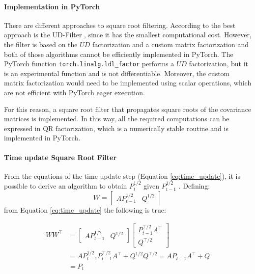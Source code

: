 \documentclass{article}
\begin{document}
\paragraph{Implementation in PyTorch}
There are different approaches to square root filtering. According to \textcite{mohinder_s_grewal_kalman_2001} the best approach is the UD-Filter \cite{bierman_numerical_1977}, since it has the smallest computational cost. However, the filter is based on the $UD$ factorization and a custom matrix factorization \cite{mohinder_s_grewal_kalman_2001} and both of those algorithms cannot be efficiently implemented in \textsf{PyTorch}. The \textsf{PyTorch} function \verb|torch.linalg.ldl_factor| performs a $UD$ factorization, but it is an experimental function and is not differentiable. Moreover, the custom matrix factorization would need to be implemented using scalar operations, which are not efficient with \textsf{PyTorch} eager execution.

For this reason, a square root filter that propagates square roots of the covariance matrices is implemented. In this way, all the required computations can be expressed in QR factorization, which is a numerically stable routine and is implemented in \textsf{PyTorch}.

\paragraph{Time update Square Root Filter}

From the equations of the time update step (Equation \ref{eq:time_update}), it is possible to derive an algorithm to obtain $P_t^{1/2}$ given $P_{t-1}^{1/2}$ \cite[eq. 6.60]{mohinder_s_grewal_kalman_2001}. Defining:
\begin{equation*}
    W = \begin{bmatrix}AP_{t-1}^{1/2} & Q^{1/2}\end{bmatrix}
\end{equation*}
from Equation \ref{eq:time_update} the following is true:


\begin{align*}
  WW^\top &=  \begin{bmatrix}AP_{t-1}^{1/2} & Q^{1/2}\end{bmatrix}\begin{bmatrix}P_{t-1}^{\top/2}A^\top \\ Q^{\top/2}\end{bmatrix}
  \\ &= AP_{t-1}^{1/2}P_{t-1}^{\top/2}A^\top + Q^{1/2}Q^{\top/2} = AP_{t-1}A^\top + Q\\ &= P_t
\end{align*}
\end{document}
